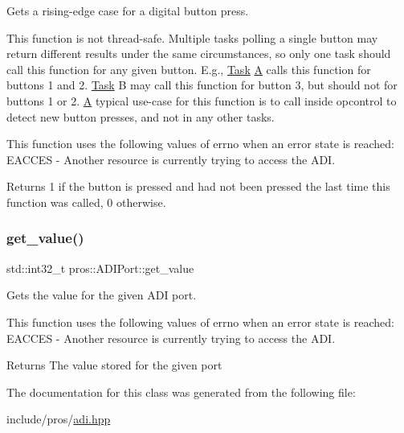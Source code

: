 Gets a rising-\/edge case for a digital button press. 

This function is not thread-\/safe. Multiple tasks polling a single button may return different results under the same circumstances, so only one task should call this function for any given button. E.\+g., \mbox{\hyperlink{classpros_1_1Task}{Task}} \mbox{\hyperlink{structA}{A}} calls this function for buttons 1 and 2. \mbox{\hyperlink{classpros_1_1Task}{Task}} B may call this function for button 3, but should not for buttons 1 or 2. \mbox{\hyperlink{structA}{A}} typical use-\/case for this function is to call inside opcontrol to detect new button presses, and not in any other tasks.

This function uses the following values of errno when an error state is reached\+: E\+A\+C\+C\+ES -\/ Another resource is currently trying to access the A\+DI.

\begin{DoxyReturn}{Returns}
1 if the button is pressed and had not been pressed the last time this function was called, 0 otherwise. 
\end{DoxyReturn}
\mbox{\label{classpros_1_1ADIDigitalIn_ac79b5fd3ce67ae6ffc4b1fbbb306e997}} 
\subsubsection{\texorpdfstring{get\_value()}{get\_value()}}
{\footnotesize\ttfamily std\+::int32\+\_\+t pros\+::\+A\+D\+I\+Port\+::get\+\_\+value}



Gets the value for the given A\+DI port. 

This function uses the following values of errno when an error state is reached\+: E\+A\+C\+C\+ES -\/ Another resource is currently trying to access the A\+DI.

\begin{DoxyReturn}{Returns}
The value stored for the given port 
\end{DoxyReturn}


The documentation for this class was generated from the following file\+:\begin{DoxyCompactItemize}
\item 
include/pros/\mbox{\hyperlink{adi_8hpp}{adi.\+hpp}}\end{DoxyCompactItemize}
